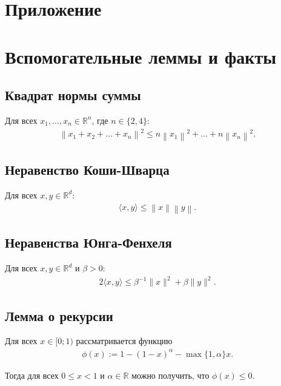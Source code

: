 \section*{Приложение}

\section{Вспомогательные леммы и факты}

\subsection{Квадрат нормы суммы} \label{axil:squared}
    
    Для всех $x_1, \dots , x_n \in \mathbb{R}^n$, где $n \in \{2, 4\}$:
    \begin{align*}
        \left\| x_1 + x_2 + \dots + x_n \right\|^2 \leq n \left\| x_1 \right\|^2 + \dots + n \left\| x_n \right\|^2. 
    \end{align*}

\subsection{Неравенство Коши-Шварца} \label{axil:cauchy_schwarz}

    Для всех $x, y \in \mathbb{R}^d$:
    \begin{align*}
        \langle x, y \rangle \leq \left\| x \right\| \left\| y \right\|.
    \end{align*}

    \subsection{Неравенства Юнга-Фенхеля} \label{axil:fenchel_young}
    
    Для всех $x, y \in \mathbb{R}^d$ и $\beta > 0$:
    \begin{align*}
        2 \langle x, y \rangle \leq \beta^{-1} \| x \|^2 + \beta \| y \|^2.
    \end{align*}

\subsection{Лемма о рекурсии}
    
    \begin{lemma} \label{lemma:baskirskaya_lemma}
    
        Для всех $x \in [0; 1)$ рассматривается функцию
        \begin{align*}
            \phi(x) := 1 - (1 - x)^{\alpha} - \max \{1, \alpha\} x.
        \end{align*}
        
        Тогда для всех $0 \leq x < 1$ и $\alpha \in \mathbb{R}$ можно получить, что $\phi(x) \leq 0$.
        
    \end{lemma}
    
